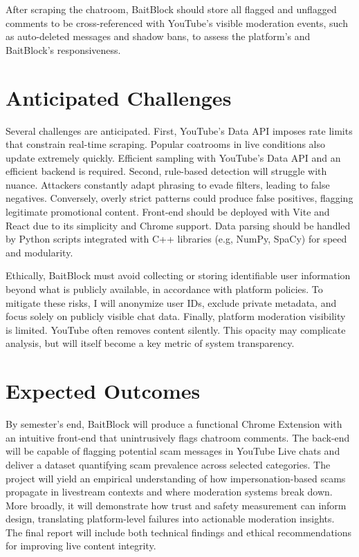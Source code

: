 \documentclass[letterpaper,twocolumn,10pt]{article}
\begin{document}
After scraping the chatroom, BaitBlock should store all flagged and unflagged comments to be cross-referenced with YouTube’s visible moderation events, such as auto-deleted messages and shadow bans, to assess the platform’s and BaitBlock’s responsiveness.

\section{Anticipated Challenges}

Several challenges are anticipated. First, YouTube’s Data API imposes rate limits that constrain real-time scraping. Popular coatrooms in live conditions also update extremely quickly. Efficient sampling with YouTube's Data API and an efficient backend is required. Second, rule-based detection will struggle with nuance. Attackers constantly adapt phrasing to evade filters, leading to false negatives. Conversely, overly strict patterns could produce false positives, flagging legitimate promotional content. Front-end should be deployed with Vite and React due to its simplicity and Chrome support. Data parsing should be handled by Python scripts integrated with C++ libraries (e.g, NumPy, SpaCy) for speed and modularity.

Ethically, BaitBlock must avoid collecting or storing identifiable user information beyond what is publicly available, in accordance with platform policies. To mitigate these risks, I will anonymize user IDs, exclude private metadata, and focus solely on publicly visible chat data. Finally, platform moderation visibility is limited. YouTube often removes content silently. This opacity may complicate analysis, but will itself become a key metric of system transparency.

\section{Expected Outcomes}

By semester’s end, BaitBlock will produce a functional Chrome Extension with an intuitive front-end that unintrusively flags chatroom comments. The back-end will be capable of flagging potential scam messages in YouTube Live chats and deliver a dataset quantifying scam prevalence across selected categories. The project will yield an empirical understanding of how impersonation-based scams propagate in livestream contexts and where moderation systems break down. More broadly, it will demonstrate how trust and safety measurement can inform design, translating platform-level failures into actionable moderation insights. The final report will include both technical findings and ethical recommendations for improving live content integrity.
\end{document}
